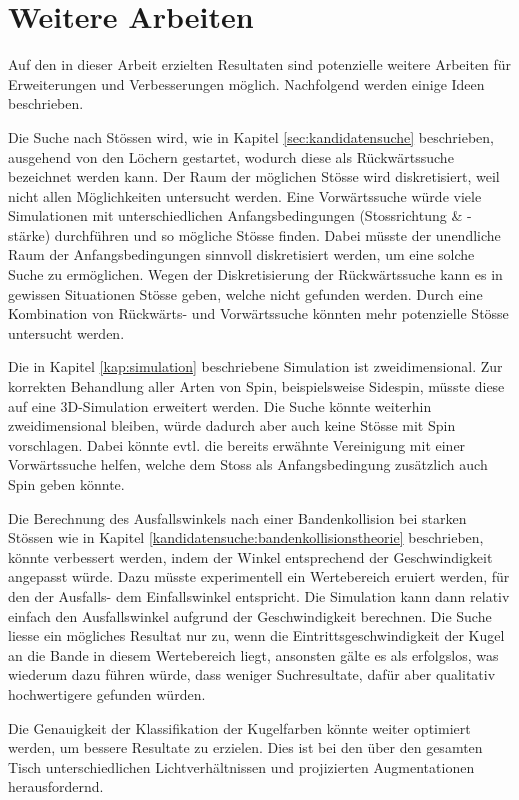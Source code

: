 \chapter{Weitere Arbeiten}\label{kap:weitere_arbeiten}
Auf den in dieser Arbeit erzielten Resultaten sind potenzielle weitere Arbeiten für Erweiterungen und Verbesserungen
möglich.
Nachfolgend werden einige Ideen beschrieben.

Die Suche nach Stössen wird, wie in Kapitel \ref{sec:kandidatensuche} beschrieben, ausgehend von den Löchern gestartet,
wodurch diese als Rückwärtssuche bezeichnet werden kann.
Der Raum der möglichen Stösse wird diskretisiert, weil nicht allen Möglichkeiten untersucht werden.
Eine Vorwärtssuche würde viele Simulationen mit unterschiedlichen Anfangsbedingungen (Stossrichtung \& -stärke)
durchführen und so mögliche Stösse finden.
Dabei müsste der unendliche Raum der Anfangsbedingungen sinnvoll diskretisiert werden, um eine solche Suche zu ermöglichen.
Wegen der Diskretisierung der Rückwärtssuche kann es in gewissen Situationen Stösse geben, welche nicht gefunden werden.
Durch eine Kombination von Rückwärts- und Vorwärtssuche könnten mehr potenzielle Stösse untersucht werden.

Die in Kapitel \ref{kap:simulation} beschriebene Simulation ist zweidimensional.
Zur korrekten Behandlung aller Arten von Spin, beispielsweise Sidespin, müsste diese auf eine 3D-Simulation erweitert werden.
Die Suche könnte weiterhin zweidimensional bleiben, würde dadurch aber auch keine Stösse mit Spin vorschlagen.
Dabei könnte evtl. die bereits erwähnte Vereinigung mit einer Vorwärtssuche helfen, welche dem Stoss als
Anfangsbedingung zusätzlich auch Spin geben könnte.

Die Berechnung des Ausfallswinkels nach einer Bandenkollision bei starken Stössen wie in
Kapitel \ref{kandidatensuche:bandenkollisionstheorie} beschrieben, könnte verbessert werden, indem der Winkel entsprechend
der Geschwindigkeit angepasst würde. Dazu müsste experimentell ein Wertebereich eruiert werden, für den der Ausfalls- dem
Einfallswinkel entspricht. Die Simulation kann dann relativ einfach den Ausfallswinkel aufgrund der Geschwindigkeit
berechnen. Die Suche liesse ein mögliches Resultat nur zu, wenn die Eintrittsgeschwindigkeit der Kugel an die Bande
in diesem Wertebereich liegt, ansonsten gälte es als erfolgslos, was wiederum dazu führen würde,
dass weniger Suchresultate, dafür aber qualitativ hochwertigere gefunden würden.

Die Genauigkeit der Klassifikation der Kugelfarben könnte weiter optimiert werden, um bessere Resultate zu erzielen.
Dies ist bei den über den gesamten Tisch unterschiedlichen Lichtverhältnissen und projizierten Augmentationen herausfordernd.


